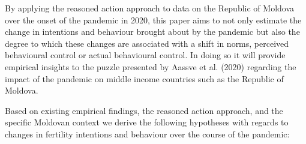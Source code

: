 \documentclass[10pt,letterpaper]{article}
\begin{document}
By applying the reasoned action approach to data on the Republic of Moldova over the onset of the pandemic in 2020, this paper aims to not only estimate the change in intentions and behaviour brought about by the pandemic but also the degree to which these changes are associated with a shift in norms, perceived behavioural control or actual behavioural control. In doing so it will provide empirical insights to the puzzle presented by Aassve et al. (2020) regarding the impact of the pandemic on middle income countries such as the Republic of Moldova.

Based on existing empirical findings, the reasoned action approach, and the specific Moldovan context we derive the following hypotheses with regards to changes in fertility intentions and behaviour over the course of the pandemic:
\end{document}
